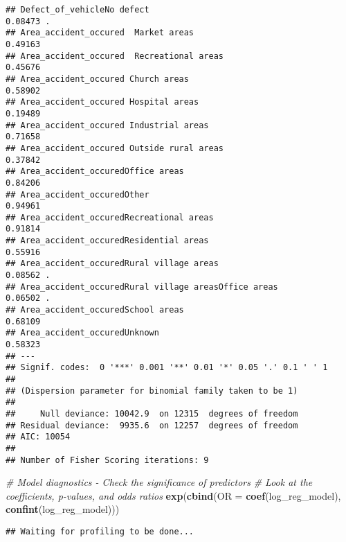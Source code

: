 \documentclass[
]{article}
\newenvironment{Shaded}{\begin{snugshade}}{\end{snugshade}}
\newcommand{\AttributeTok}[1]{\textcolor[rgb]{0.13,0.29,0.53}{#1}}
\newcommand{\CommentTok}[1]{\textcolor[rgb]{0.56,0.35,0.01}{\textit{#1}}}
\newcommand{\FunctionTok}[1]{\textcolor[rgb]{0.13,0.29,0.53}{\textbf{#1}}}
\newcommand{\NormalTok}[1]{#1}
\begin{document}
\begin{verbatim}
## Defect_of_vehicleNo defect                                    0.08473 .  
## Area_accident_occured  Market areas                           0.49163    
## Area_accident_occured  Recreational areas                     0.45676    
## Area_accident_occured Church areas                            0.58902    
## Area_accident_occured Hospital areas                          0.19489    
## Area_accident_occured Industrial areas                        0.71658    
## Area_accident_occured Outside rural areas                     0.37842    
## Area_accident_occuredOffice areas                             0.84206    
## Area_accident_occuredOther                                    0.94961    
## Area_accident_occuredRecreational areas                       0.91814    
## Area_accident_occuredResidential areas                        0.55916    
## Area_accident_occuredRural village areas                      0.08562 .  
## Area_accident_occuredRural village areasOffice areas          0.06502 .  
## Area_accident_occuredSchool areas                             0.68109    
## Area_accident_occuredUnknown                                  0.58323    
## ---
## Signif. codes:  0 '***' 0.001 '**' 0.01 '*' 0.05 '.' 0.1 ' ' 1
## 
## (Dispersion parameter for binomial family taken to be 1)
## 
##     Null deviance: 10042.9  on 12315  degrees of freedom
## Residual deviance:  9935.6  on 12257  degrees of freedom
## AIC: 10054
## 
## Number of Fisher Scoring iterations: 9
\end{verbatim}

\begin{Shaded}
\begin{Highlighting}[]
\CommentTok{\# Model diagnostics {-} Check the significance of predictors}
\CommentTok{\# Look at the coefficients, p{-}values, and odds ratios}
\FunctionTok{exp}\NormalTok{(}\FunctionTok{cbind}\NormalTok{(}\AttributeTok{OR =} \FunctionTok{coef}\NormalTok{(log\_reg\_model), }\FunctionTok{confint}\NormalTok{(log\_reg\_model)))}
\end{Highlighting}
\end{Shaded}

\begin{verbatim}
## Waiting for profiling to be done...
\end{verbatim}
\end{document}
